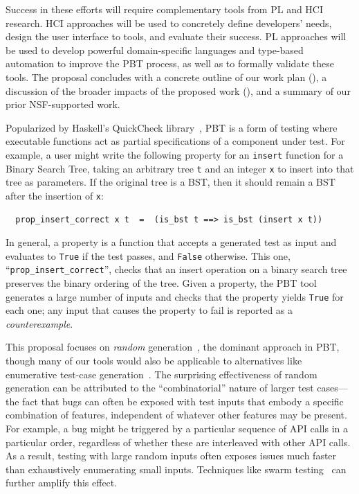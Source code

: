 %
Success in these efforts will require complementary tools from PL
and HCI research. HCI approaches will be used to concretely define developers' needs,
design the user interface to tools, and evaluate their success. PL approaches
will be used to develop powerful domain-specific languages and type-based automation
to improve the PBT process, as well as to formally validate these
tools. The proposal concludes with a concrete outline of our work plan
(), a discussion of the broader impacts of the
proposed work (), and a summary of our
prior NSF-supported work.

%
Popularized by Haskell's QuickCheck library~\cite{hughes2007quickcheck},
PBT is a form of testing where
executable functions act as partial
specifications of a component under test. For example, a user might
write the following property for an \lstinline{insert}
function for a Binary Search Tree, taking an arbitrary tree \texttt{t}
and an integer
\texttt{x} to insert into that tree as parameters. If the original tree
is a BST, then it should remain
a BST after the insertion of \texttt{x}:
\begin{lstlisting}
  prop_insert_correct x t  =  (is_bst t ==> is_bst (insert x t))
\end{lstlisting}
In general, a property is a function that
accepts a generated
test as input and evaluates to \lstinline{True} if the test passes, and
\lstinline{False} otherwise.  This one, ``\verb|prop_insert_correct|'',
checks that an insert operation on a binary search tree preserves the
binary ordering of the tree.
Given a property, the PBT tool generates a
large number of inputs and
checks that the property yields \lstinline{True} for each one; any input
that causes the property to fail is reported as a {\em counterexample}.

This proposal focuses on {\em random}
generation~\cite{hamlet1994random}, the dominant approach in PBT,
though many of our tools would
also be applicable to alternatives like enumerative test-case
generation~\cite{DBLP:conf/haskell/RuncimanNL08, leancheck}.
The surprising effectiveness of random generation can be attributed to the
``combinatorial'' nature of larger test cases---the fact that bugs can often be
exposed with test inputs that embody a specific combination of features,
independent of whatever other features may be present. For example,
a bug might be triggered by a particular sequence of API calls in a
particular order,
regardless of whether these are
interleaved with other API calls. As a result, testing with large random
inputs often exposes issues much faster than exhaustively enumerating
small inputs.  Techniques like swarm testing~\cite{groce2012swarm} can
further amplify this effect.

